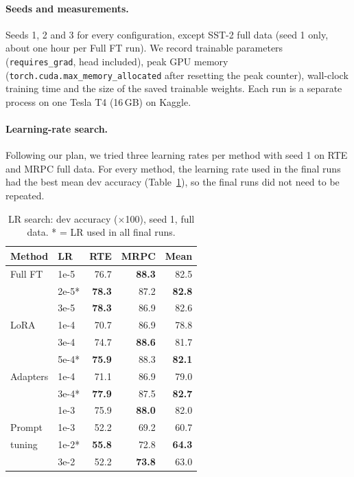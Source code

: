 \documentclass[11pt]{article}
\begin{document}
\paragraph{Seeds and measurements.} Seeds 1, 2 and 3 for every configuration, except SST-2 full data (seed 1 only, about one hour per Full FT run). We record trainable parameters (\texttt{requires\_grad}, head included), peak GPU memory (\texttt{torch.cuda.max\_memory\_allocated} after resetting the peak counter), wall-clock training time and the size of the saved trainable weights. Each run is a separate process on one Tesla T4 (16\,GB) on Kaggle.

\paragraph{Learning-rate search.} Following our plan, we tried three learning rates per method with seed 1 on RTE and MRPC full data. For every method, the learning rate used in the final runs had the best mean dev accuracy (Table~\ref{tab:lr}), so the final runs did not need to be repeated.

\begin{table}[t]
\centering
\small
\begin{tabular}{@{}llrrr@{}}
\toprule
Method & LR & RTE & MRPC & Mean \\
\midrule
Full FT & 1e-5 & 76.7 & \textbf{88.3} & 82.5 \\
 & 2e-5* & \textbf{78.3} & 87.2 & \textbf{82.8} \\
 & 3e-5 & \textbf{78.3} & 86.9 & 82.6 \\
\midrule
LoRA & 1e-4 & 70.7 & 86.9 & 78.8 \\
 & 3e-4 & 74.7 & \textbf{88.6} & 81.7 \\
 & 5e-4* & \textbf{75.9} & 88.3 & \textbf{82.1} \\
\midrule
Adapters & 1e-4 & 71.1 & 86.9 & 79.0 \\
 & 3e-4* & \textbf{77.9} & 87.5 & \textbf{82.7} \\
 & 1e-3 & 75.9 & \textbf{88.0} & 82.0 \\
\midrule
Prompt & 1e-3 & 52.2 & 69.2 & 60.7 \\
tuning & 1e-2* & \textbf{55.8} & 72.8 & \textbf{64.3} \\
 & 3e-2 & 52.2 & \textbf{73.8} & 63.0 \\
\bottomrule
\end{tabular}
\caption{LR search: dev accuracy ($\times$100), seed 1, full data. * = LR used in all final runs.}
\label{tab:lr}
\end{table}
\end{document}
